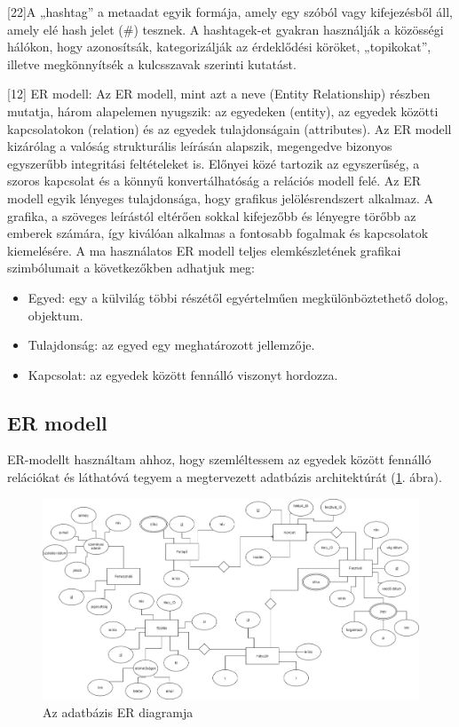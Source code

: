 [22]A „hashtag” a metaadat egyik formája, amely egy szóból vagy kifejezésből áll, amely elé hash jelet (\#) tesznek. A hashtagek-et gyakran használják a közösségi hálókon, hogy azonosítsák, kategorizálják az érdeklődési köröket, „topikokat”, illetve megkönnyítsék a kulcsszavak szerinti kutatást.

[12] ER modell: Az ER modell, mint azt a neve (Entity Relationship) részben mutatja, három alapelemen nyugszik: az egyedeken (entity), az egyedek közötti kapcsolatokon (relation) és az egyedek tulajdonságain (attributes). Az ER modell kizárólag a valóság strukturális leírásán alapszik, megengedve bizonyos egyszerűbb integritási feltételeket is. Előnyei közé tartozik az egyszerűség, a szoros kapcsolat és a könnyű konvertálhatóság a relációs modell felé.
Az ER modell egyik lényeges tulajdonsága, hogy grafikus jelölésrendszert alkalmaz. A grafika, a szöveges leírástól eltérően sokkal kifejezőbb és lényegre törőbb az emberek számára, így kiválóan alkalmas a fontosabb fogalmak és kapcsolatok kiemelésére. A ma használatos ER modell teljes elemkészletének grafikai szimbólumait a következőkben adhatjuk meg:
\begin{itemize}
\item Egyed: egy a külvilág többi részétől egyértelműen megkülönböztethető dolog, objektum. 
\item Tulajdonság: az egyed egy meghatározott jellemzője.
\item Kapcsolat: az egyedek között fennálló viszonyt hordozza.
\end{itemize}

\subsection{ER modell}

ER-modellt használtam ahhoz, hogy szemléltessem az egyedek között fennálló relációkat és láthatóvá tegyem a megtervezett adatbázis architektúrát (\ref{fig:er}. ábra).

\begin{figure}
\centering
\includegraphics[scale=0.2]{kepek/er.png}
\caption{Az adatbázis ER diagramja}
\label{fig:er}
\end{figure}

